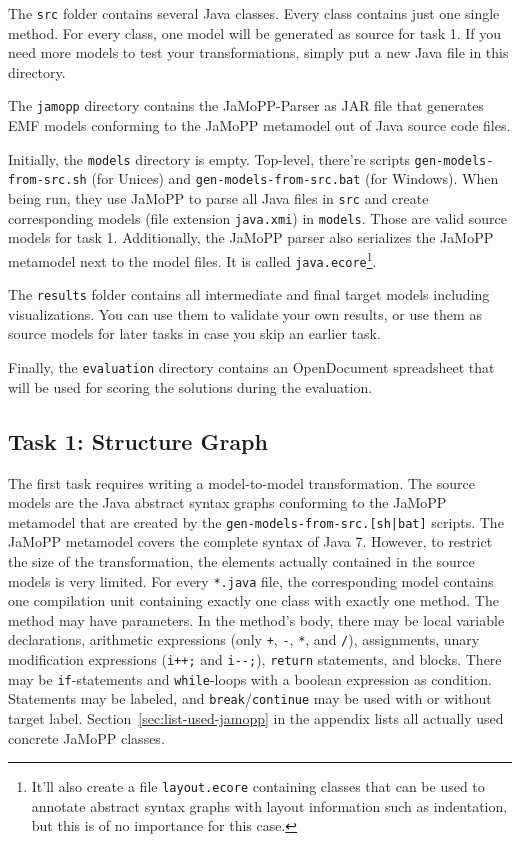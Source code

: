 \documentclass[10pt]{article}
\begin{document}
The \verb|src| folder contains several Java classes.  Every class contains just
one single method.  For every class, one model will be generated as source for
task 1.  If you need more models to test your transformations, simply put a new
Java file in this directory.

The \verb|jamopp| directory contains the JaMoPP-Parser as JAR file that
generates EMF models conforming to the JaMoPP metamodel out of Java source code
files.

Initially, the \verb|models| directory is empty.  Top-level, there're scripts
\verb|gen-models-from-src.sh| (for Unices) and \verb|gen-models-from-src.bat|
(for Windows).  When being run, they use JaMoPP to parse all Java files in
\verb|src| and create corresponding models (file extension \verb|java.xmi|) in
\verb|models|.  Those are valid source models for task 1.  Additionally, the
JaMoPP parser also serializes the JaMoPP metamodel next to the model files.  It
is called \verb|java.ecore|\footnote{It'll also create a file
  \texttt{layout.ecore} containing classes that can be used to annotate
  abstract syntax graphs with layout information such as indentation, but this
  is of no importance for this case.}.

The \verb|results| folder contains all intermediate and final target models
including visualizations.  You can use them to validate your own results, or
use them as source models for later tasks in case you skip an earlier task.

Finally, the \verb|evaluation| directory contains an OpenDocument spreadsheet
that will be used for scoring the solutions during the evaluation.


\subsection{Task 1: Structure Graph}
\label{sec:task1-structure-graph}

The first task requires writing a model-to-model transformation.  The source
models are the Java abstract syntax graphs conforming to the JaMoPP metamodel
that are created by the \verb$gen-models-from-src.[sh|bat]$ scripts.  The
JaMoPP metamodel covers the complete syntax of Java 7.  However, to restrict
the size of the transformation, the elements actually contained in the source
models is very limited.  For every \verb|*.java| file, the corresponding model
contains one compilation unit containing exactly one class with exactly one
method.  The method may have parameters.  In the method's body, there may be
local variable declarations, arithmetic expressions (only \verb|+|, \verb|-|,
\verb|*|, and \verb|/|), assignments, unary modification expressions
(\verb|i++;| and \verb|i--;|), \verb|return| statements, and blocks.  There may
be \verb|if|-statements and \verb|while|-loops with a boolean expression as
condition.  Statements may be labeled, and \verb|break|/\verb|continue| may be
used with or without target label.  Section~\ref{sec:list-used-jamopp} in the
appendix lists all actually used concrete JaMoPP classes.
\end{document}
